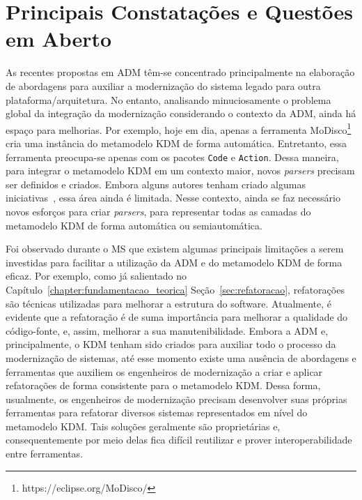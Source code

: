 \section{Principais Constatações e Questões em Aberto}\label{subsec:principais_constatações_e_questões_Em_Aberto}

As recentes propostas em ADM têm-se concentrado principalmente na elaboração de abordagens para auxiliar a modernização do sistema legado para outra plataforma/arquitetura. No entanto, analisando minuciosamente o problema global da integração da modernização considerando o contexto da ADM, ainda há espaço para melhorias. Por exemplo, hoje em dia, apenas a ferramenta MoDisco\footnote{https://eclipse.org/MoDisco/} cria uma instância do metamodelo KDM de forma automática. Entretanto, essa ferramenta preocupa-se apenas com os pacotes \texttt{Code} e \texttt{Action}. Dessa maneira, para integrar o metamodelo KDM em um contexto maior, novos \textit{parsers} precisam ser definidos e criados. Embora alguns autores tenham criado algumas iniciativas~\cite{5440163,Bruneliere_2010MODISCO}, essa área ainda é limitada. Nesse contexto, ainda se faz necessário novos esforços para criar \textit{parsers}, para representar todas as camadas do metamodelo KDM de forma automática ou semiautomática.

Foi observado durante o MS que existem algumas principais limitações a serem investidas para facilitar a utilização da ADM e do metamodelo KDM de forma eficaz. Por exemplo, como já salientado no Capítulo~\ref{chapter:fundamentacao_teorica} Seção~\ref{sec:refatoracao}, refatorações são técnicas utilizadas para melhorar a estrutura do software. Atualmente, é evidente que a refatoração é de suma importância para melhorar a qualidade do código-fonte, e, assim, melhorar a sua manutenibilidade.
Embora a ADM e, principalmente, o KDM tenham sido criados para auxiliar todo o processo da modernização de sistemas, até esse momento existe uma ausência de abordagens e ferramentas que auxiliem os engenheiros de modernização a criar e aplicar refatorações de forma consistente para o metamodelo KDM. Dessa forma, usualmente, os engenheiros de modernização precisam desenvolver suas próprias ferramentas para refatorar diversos sistemas representados em nível do metamodelo KDM. Tais soluções geralmente são proprietárias e, consequentemente por meio delas fica difícil reutilizar e prover interoperabilidade entre ferramentas.

